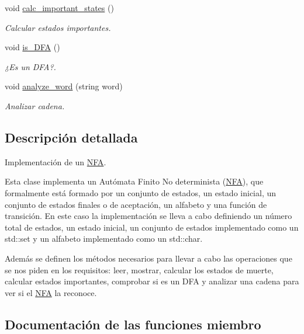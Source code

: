 \begin{DoxyCompactItemize}
void \mbox{\hyperlink{class_n_f_a_addc2cae46439f77116f37230ec8a90d0}{calc\+\_\+important\+\_\+states}} ()
\begin{DoxyCompactList}\small\item\em Calcular estados importantes. \end{DoxyCompactList}\item 
void \mbox{\hyperlink{class_n_f_a_a36415a14d2ffcd179ff3a2f96b80da0d}{is\+\_\+\+D\+FA}} ()
\begin{DoxyCompactList}\small\item\em ¿\+Es un D\+FA?. \end{DoxyCompactList}\item 
void \mbox{\hyperlink{class_n_f_a_a7cad5fd6ba765d9d8099793421100234}{analyze\+\_\+word}} (string word)
\begin{DoxyCompactList}\small\item\em Analizar cadena. \end{DoxyCompactList}\end{DoxyCompactItemize}


\subsection{Descripción detallada}
Implementación de un \mbox{\hyperlink{class_n_f_a}{N\+FA}}. 

Esta clase implementa un Autómata Finito No determinista (\mbox{\hyperlink{class_n_f_a}{N\+FA}}), que formalmente está formado por un conjunto de estados, un estado inicial, un conjunto de estados finales o de aceptación, un alfabeto y una función de transición. En este caso la implementación se lleva a cabo definiendo un número total de estados, un estado inicial, un conjunto de estados implementado como un std\+::set y un alfabeto implementado como un std\+::char.

Además se definen los métodos necesarios para llevar a cabo las operaciones que se nos piden en los requisitos\+: leer, mostrar, calcular los estados de muerte, calcular estados importantes, comprobar si es un D\+FA y analizar una cadena para ver si el \mbox{\hyperlink{class_n_f_a}{N\+FA}} la reconoce. 

\subsection{Documentación de las funciones miembro}
\mbox{\label{class_n_f_a_a7cad5fd6ba765d9d8099793421100234}} 
